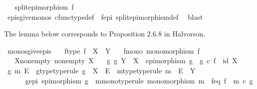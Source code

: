 \begin{isabellebody}
\ \ \ {\isachardoublequoteopen}split{\isacharunderscore}{\kern0pt}epimorphism\ f{\isachardoublequoteclose}\isanewline
%
\isadelimproof
\ \ %
\endisadelimproof
%
\isatagproof
{}\isamarkupfalse%
\ epis{\isacharunderscore}{\kern0pt}give{\isacharunderscore}{\kern0pt}monos\ cfunc{\isacharunderscore}{\kern0pt}type{\isacharunderscore}{\kern0pt}def\ \ f{\isacharunderscore}{\kern0pt}epi\ split{\isacharunderscore}{\kern0pt}epimorphism{\isacharunderscore}{\kern0pt}def\ \isamarkupfalse%
\ blast%
\endisatagproof
{\isafoldproof}%
%
\isadelimproof
%
\endisadelimproof
%
\begin{isamarkuptext}%
The lemma below corresponds to Proposition 2.6.8 in Halvorson.%
\end{isamarkuptext}\isamarkuptrue%
\isamarkupfalse%
\ monos{\isacharunderscore}{\kern0pt}give{\isacharunderscore}{\kern0pt}epis{\isacharcolon}{\kern0pt}\isanewline
\ \ \ f{\isacharunderscore}{\kern0pt}type{\isacharcolon}{\kern0pt}\ {\isachardoublequoteopen}f\ {\isacharcolon}{\kern0pt}\ X\ {\isasymrightarrow}\ Y{\isachardoublequoteclose}\isanewline
\ \ \ f{\isacharunderscore}{\kern0pt}mono{\isacharcolon}{\kern0pt}\ {\isachardoublequoteopen}monomorphism\ f{\isachardoublequoteclose}\isanewline
\ \ \ X{\isacharunderscore}{\kern0pt}nonempty{\isacharcolon}{\kern0pt}\ {\isachardoublequoteopen}nonempty\ X{\isachardoublequoteclose}\isanewline
\ \ \ {\isachardoublequoteopen}{\isasymexists}g{\isachardot}{\kern0pt}\ g{\isacharcolon}{\kern0pt}\ Y\ {\isasymrightarrow}\ X\ {\isasymand}\ epimorphism\ g\ {\isasymand}\ g\ {\isasymcirc}\isactrlsub c\ f\ {\isacharequal}{\kern0pt}\ id\ X{\isachardoublequoteclose}\isanewline
%
\isadelimproof
%
\endisadelimproof
%
\isatagproof
{}\isamarkupfalse%
\ {\isacharminus}{\kern0pt}\isanewline
\ \ \isamarkupfalse%
\ g\ m\ E\ \ g{\isacharunderscore}{\kern0pt}type{\isacharbrackleft}{\kern0pt}type{\isacharunderscore}{\kern0pt}rule{\isacharbrackright}{\kern0pt}{\isacharcolon}{\kern0pt}\ {\isachardoublequoteopen}g\ {\isacharcolon}{\kern0pt}\ X\ {\isasymrightarrow}\ E{\isachardoublequoteclose}\ \ m{\isacharunderscore}{\kern0pt}type{\isacharbrackleft}{\kern0pt}type{\isacharunderscore}{\kern0pt}rule{\isacharbrackright}{\kern0pt}{\isacharcolon}{\kern0pt}\ {\isachardoublequoteopen}m\ {\isacharcolon}{\kern0pt}\ E\ {\isasymrightarrow}\ Y{\isachardoublequoteclose}\ \isanewline
\ \ \ \ \ \ g{\isacharunderscore}{\kern0pt}epi{\isacharcolon}{\kern0pt}\ {\isachardoublequoteopen}epimorphism\ g{\isachardoublequoteclose}\ \ m{\isacharunderscore}{\kern0pt}mono{\isacharbrackleft}{\kern0pt}type{\isacharunderscore}{\kern0pt}rule{\isacharbrackright}{\kern0pt}{\isacharcolon}{\kern0pt}\ {\isachardoublequoteopen}monomorphism\ m{\isachardoublequoteclose}\ \ f{\isacharunderscore}{\kern0pt}eq{\isacharcolon}{\kern0pt}\ {\isachardoublequoteopen}f\ {\isacharequal}{\kern0pt}\ m\ {\isasymcirc}\isactrlsub c\ g{\isachardoublequoteclose}\isanewline

\end{isabellebody}
